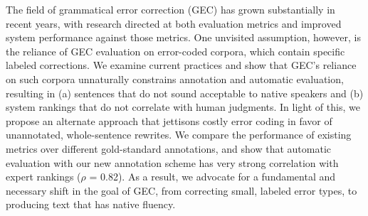 The field of grammatical error correction (GEC) has grown substantially in recent years, with research directed at both evaluation metrics and improved system performance against those metrics. One unvisited assumption, however, is the reliance of GEC evaluation on error-coded corpora, which contain specific labeled corrections. We examine current practices and show that GEC's reliance on such corpora unnaturally constrains annotation and automatic evaluation, resulting in (a) sentences that do not sound acceptable to native speakers and (b) system rankings that do not correlate with human judgments. In light of this, we propose an alternate approach that jettisons costly error coding in favor of unannotated, whole-sentence rewrites. We compare the performance of existing metrics over different gold-standard annotations, and show that automatic evaluation with our new annotation scheme has very strong correlation with expert rankings ($\rho$ = 0.82). As a result, we advocate for a fundamental and necessary shift in the goal of GEC, from correcting small, labeled error types, to producing text that has native fluency.
